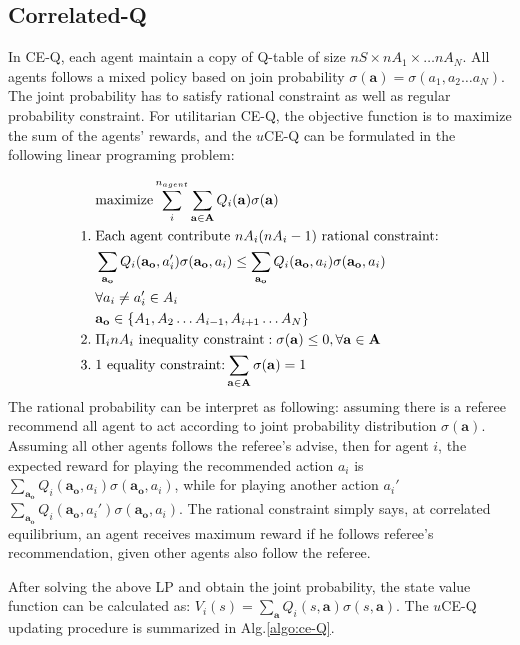 \documentclass[conference]{IEEEtran}
\begin{document}
\subsection{Correlated-Q}
In CE-Q, each agent maintain a copy of Q-table of size $nS\times nA_1 \times\dots nA_N$. All agents follows a mixed policy based on join probability $\sigma(\mathbf{a}) = \sigma(a_1, a_2 \dots a_N)$. The joint probability has to satisfy rational constraint as well as regular probability constraint. For utilitarian CE-Q, the objective function is to maximize the sum of the agents’ rewards, and the $u$CE-Q can be formulated in the following linear programing problem:

\begin{align}
&\text{maximize} \sum_i^{n_{agent}} \sum_{\mathbf{a}\in\mathbf{A}} Q_i(\mathbf{a}) \sigma(\mathbf{a}) \notag \\
1.\; & \text{Each agent contribute $nA_i(nA_i-1)$ rational constraint:} \notag\\
& \sum_{\mathbf{a_o}} Q_i(\mathbf{a_o}, a_i')\sigma(\mathbf{a_o}, a_i) \le \sum_{\mathbf{a_o}}  Q_i(\mathbf{a_o}, a_i)  \sigma(\mathbf{a_o}, a_i) \notag \\
& \forall a_i\neq a_i' \in A_i  \notag \\
& \mathbf{a_o} \in \{ A_1, A_2 \dots A_{i-1}, A_{i+1} \dots A_{N} \} \notag \\
2.\; & \text{$\Pi_i  nA_i$ inequality constraint}: \sigma(\mathbf{a})\le 0,  \forall \mathbf{a}\in\mathbf{A}\notag \\
3.\; &\text{1 equality constraint:} \sum_{\mathbf{a}\in\mathbf{A}} \sigma(\mathbf{a}) = 1
\end{align}
The rational probability can be interpret as following: assuming there is a referee recommend all agent to act according to joint probability distribution $\sigma(\mathbf{a})$. Assuming all other agents follows the referee's advise, then for agent $i$, the expected reward for playing the recommended action $a_i$ is $\sum_{\mathbf{a_o}}  Q_i(\mathbf{a_o}, a_i)  \sigma(\mathbf{a_o}, a_i)$, while for playing another action $a_i'$ $\sum_{\mathbf{a_o}}  Q_i(\mathbf{a_o}, a_i')  \sigma(\mathbf{a_o}, a_i)$. The rational constraint simply says, at correlated equilibrium, an agent receives maximum reward if he follows referee's recommendation, given other agents also follow the referee.

After solving the above LP and obtain the joint probability, the state value function can be calculated as: $V_i(s) = \sum_{\mathbf{a}} Q_i(s, \mathbf{a}) \sigma(s, \mathbf{a})$. The $u$CE-Q updating procedure is summarized in Alg.\ref{algo:ce-Q}.
\end{document}
